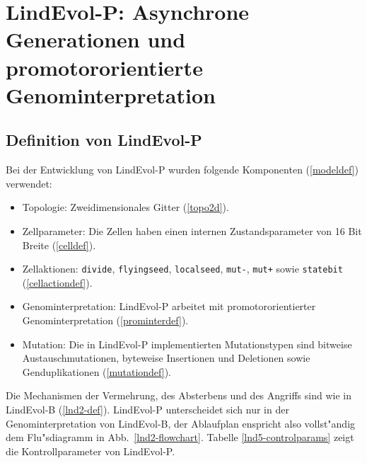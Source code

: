 \chapter[LindEvol-P]{LindEvol-P: Asynchrone Generationen und promotororientierte Genominterpretation}
\label{lindevol-5}


\section[Definition]{Definition von LindEvol-P}
\label{lnd5-def}

Bei der Entwicklung von LindEvol-P wurden folgende Komponenten (\ref{modeldef}) verwendet:

\begin{itemize}
\item Topologie: Zweidimensionales Gitter (\protect\ref{topo2d}).
\item Zellparameter: Die Zellen haben einen internen Zustandsparameter von
    16 Bit Breite (\protect\ref{celldef}).
\item \begin{sloppypar}Zellaktionen: \verb|divide|, \verb|flyingseed|, \verb|localseed|,
    \verb|mut-|, \verb|mut+| sowie \verb|statebit| (\protect\ref{cellactiondef}).
    \end{sloppypar}
\item Genominterpretation: LindEvol-P arbeitet mit promotororientierter
    Genominterpretation (\protect\ref{prominterdef}).
\item Mutation: Die in LindEvol-P implementierten Mutationstypen sind
    bitweise Austauschmutationen, byteweise Insertionen und Deletionen
    sowie Genduplikationen (\protect\ref{mutationdef}).
\end{itemize}

Die Mechanismen der Vermehrung, des Absterbens und des Angriffs sind wie in
LindEvol-B (\ref{lnd2-def}). LindEvol-P unterscheidet sich nur in der
Genominterpretation von LindEvol-B, der Ablaufplan enspricht also vollst"andig
dem Flu"sdiagramm in Abb.\ \ref{lnd2-flowchart}. Tabelle \ref{lnd5-controlparams}
zeigt die Kontrollparameter von LindEvol-P.



